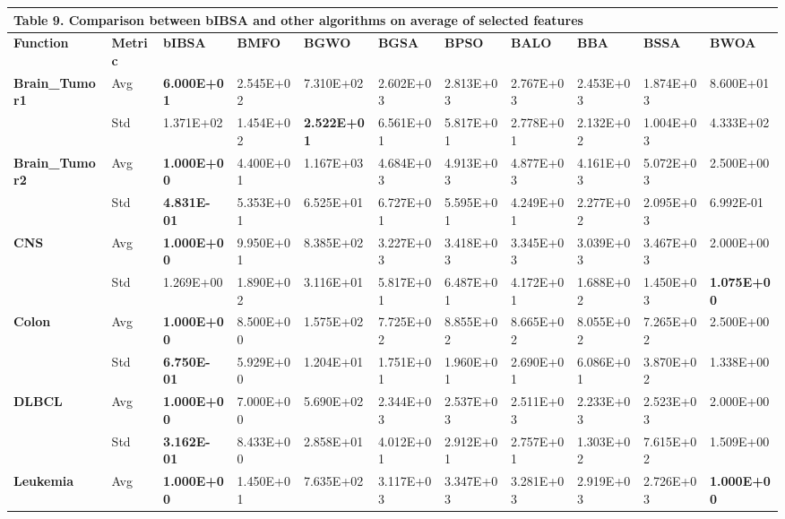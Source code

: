 \documentclass{article} %
\begin{document}
\begin{tabular}{|p{0.6in}|p{0.3in}|p{0.4in}|p{0.4in}|p{0.4in}|p{0.4in}|p{0.4in}|p{0.4in}|p{0.4in}|p{0.4in}|p{0.4in}|} \hline 
\multicolumn{10}{|p{1in}|}{\textbf{Table }9\textbf{. }Comparison between bIBSA and other algorithms on average of selected features\textbf{}} & \textbf{} \\ \hline 
\textbf{Function} & \textbf{Metric} & \textbf{bIBSA} & \textbf{BMFO} & \textbf{BGWO} & \textbf{BGSA} & \textbf{BPSO} & \textbf{BALO} & \textbf{BBA} & \textbf{BSSA} & \textbf{BWOA} \\ \hline 
\textbf{Brain\_Tumor1} & Avg & \textbf{6.000E+01} & 2.545E+02 & 7.310E+02 & 2.602E+03 & 2.813E+03 & 2.767E+03 & 2.453E+03 & 1.874E+03 & 8.600E+01 \\ \hline 
\textbf{} & Std & 1.371E+02\textbf{} & 1.454E+02 & \textbf{2.522E+01} & 6.561E+01 & 5.817E+01 & 2.778E+01 & 2.132E+02 & 1.004E+03 & 4.333E+02 \\ \hline 
\textbf{Brain\_Tumor2} & Avg & \textbf{1.000E+00} & 4.400E+01 & 1.167E+03 & 4.684E+03 & 4.913E+03 & 4.877E+03 & 4.161E+03 & 5.072E+03 & 2.500E+00 \\ \hline 
\textbf{} & Std & \textbf{4.831E-01} & 5.353E+01 & 6.525E+01 & 6.727E+01 & 5.595E+01 & 4.249E+01 & 2.277E+02 & 2.095E+03 & 6.992E-01 \\ \hline 
\textbf{CNS} & Avg & \textbf{1.000E+00} & 9.950E+01 & 8.385E+02 & 3.227E+03 & 3.418E+03 & 3.345E+03 & 3.039E+03 & 3.467E+03 & 2.000E+00 \\ \hline 
\textbf{} & Std & 1.269E+00\textbf{} & 1.890E+02 & 3.116E+01 & 5.817E+01 & 6.487E+01 & 4.172E+01 & 1.688E+02 & 1.450E+03 & \textbf{1.075E+00} \\ \hline 
\textbf{Colon} & Avg & \textbf{1.000E+00} & 8.500E+00 & 1.575E+02 & 7.725E+02 & 8.855E+02 & 8.665E+02 & 8.055E+02 & 7.265E+02 & 2.500E+00 \\ \hline 
\textbf{} & Std & \textbf{6.750E-01} & 5.929E+00 & 1.204E+01 & 1.751E+01 & 1.960E+01 & 2.690E+01 & 6.086E+01 & 3.870E+02 & 1.338E+00 \\ \hline 
\textbf{DLBCL} & Avg & \textbf{1.000E+00} & 7.000E+00\textbf{} & 5.690E+02 & 2.344E+03 & 2.537E+03 & 2.511E+03 & 2.233E+03 & 2.523E+03 & 2.000E+00 \\ \hline 
\textbf{} & Std & \textbf{3.162E-01} & 8.433E+00\textbf{} & 2.858E+01 & 4.012E+01 & 2.912E+01 & 2.757E+01 & 1.303E+02 & 7.615E+02 & 1.509E+00 \\ \hline 
\textbf{Leukemia} & Avg & \textbf{1.000E+00} & 1.450E+01 & 7.635E+02 & 3.117E+03 & 3.347E+03 & 3.281E+03 & 2.919E+03 & 2.726E+03 & \textbf{1.000E+00} \\ \hline 

\end{tabular}
\end{document}
